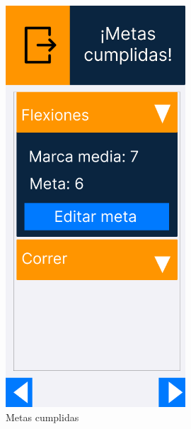 \begin{figure}[H]
   \centering
    \includegraphics[width=0.6\textwidth]{fotos/Frame 37.png}
    \caption{Metas cumplidas}
    \label{fig:Metas cumplidas}
\end{figure}
